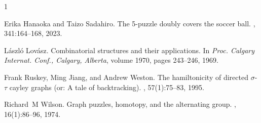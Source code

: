 \documentclass[lualatex,11pt]{article}
\begin{document}
\begin{thebibliography}{1}

Erika Hanaoka and Taizo Sadahiro.
\newblock The 5-puzzle doubly covers the soccer ball.
, 341:164--168, 2023.

L{\'a}szl{\'o} Lov{\'a}sz.
\newblock Combinatorial structures and their applications.
\newblock In {\em Proc. Calgary Internat. Conf., Calgary, Alberta}, volume
  1970, pages 243--246, 1969.

Frank Ruskey, Ming Jiang, and Andrew Weston.
\newblock The hamiltonicity of directed $\sigma$-$\tau$ cayley graphs (or: A
  tale of backtracking).
, 57(1):75--83, 1995.

Richard~M Wilson.
\newblock Graph puzzles, homotopy, and the alternating group.
, 16(1):86--96, 1974.

\end{thebibliography}
\end{document}
